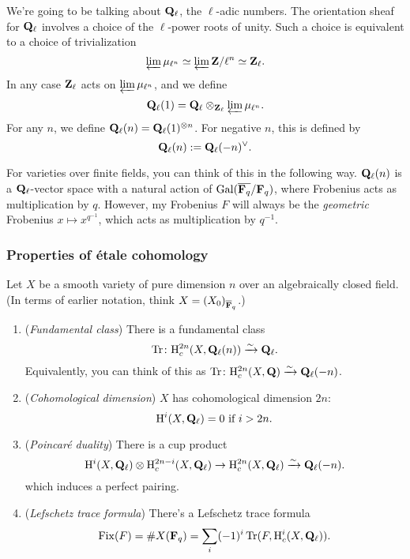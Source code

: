 We're going to be talking about $\mathbf{Q}_{\ell}$, the $\ell$-adic numbers. The orientation sheaf for $\mathbf{Q}_{\ell}$ involves a choice of the $\ell$-power roots of unity. Such a choice is equivalent to a choice of trivialization 
\[
\varprojlim \mu_{\ell^n} \simeq \varprojlim \mathbf{Z}/\ell^n \simeq \mathbf{Z}_{\ell}.
\]
In any case $\mathbf{Z}_{\ell}$ acts on $\varprojlim \mu_{\ell^n} $, and we define 
\[
\mathbf{Q}_{\ell}(1) = \mathbf{Q}_{\ell} \otimes_{\mathbf{Z}_{\ell}} \varprojlim \mu_{\ell^n}.
\]
For any $n$, we define $\mathbf{Q}_{\ell}(n) = \mathbf{Q}_{\ell}(1)^{\otimes n}$. For negative $n$, this is defined by 
\[
\mathbf{Q}_{\ell}(n) := \mathbf{Q}_{\ell}(-n)^{\vee}.
\]

\begin{rem} For varieties over finite fields, you can think of this in the following way. $\mathbf{Q}_{\ell}(n)$ is a $\mathbf{Q}_{\ell}$-vector space with a natural action of $\operatorname{Gal}(\overline{\mathbf{F}_q}/\mathbf{F}_q)$, where Frobenius acts as multiplication by $q$. However, my Frobenius $F$ will always be the \emph{geometric} Frobenius $x \mapsto x^{q^{-1}}$, which acts as multiplication by $q^{-1}$. \\
\end{rem}

\subsubsection{Properties of \'{e}tale cohomology}
 Let $X$ be a smooth variety of pure dimension $n$  over an algebraically closed field. (In terms of earlier notation, think $X = (X_0)_{\overline{\mathbf{F}}_q}$.) 
\begin{enumerate}
\item (\emph{Fundamental class}) There is a fundamental class 
\[
\operatorname{Tr} \colon \mathrm{H}_c^{2n}(X, \mathbf{Q}_{\ell}(n)) \xrightarrow{\sim} \mathbf{Q}_{\ell}.
\]
Equivalently, you can think of this as $\operatorname{Tr} \colon \mathrm{H}_c^{2n}(X, \mathbf{Q}) \xrightarrow{\sim} \mathbf{Q}_{\ell}(-n)$. 

\item (\emph{Cohomological dimension}) $X$ has cohomological dimension $2n$: 
\[
\mathrm{H}^i(X, \mathbf{Q}_{\ell}) =0 \text{ if }i>2n.
\]
\item (\emph{Poincar\'{e} duality}) There is a cup product 
\[
\mathrm{H}^i(X, \mathbf{Q}_{\ell}) \otimes \mathrm{H}^{2n-i}_c (X, \mathbf{Q}_{\ell})  \rightarrow \mathrm{H}_c^{2n}(X, \mathbf{Q}_{\ell}) \xrightarrow{\sim} \mathbf{Q}_{\ell}(-n).
\]
which induces a perfect pairing. 
\item (\emph{Lefschetz trace formula}) There's a Lefschetz trace formula
\[
\mathrm{Fix}(F) = \# X(\mathbf{F}_q) = \sum_i (-1)^i \operatorname{Tr}(F, \mathrm{H}_c^i(X, \mathbf{Q}_{\ell}) ). 
\]
\end{enumerate}

